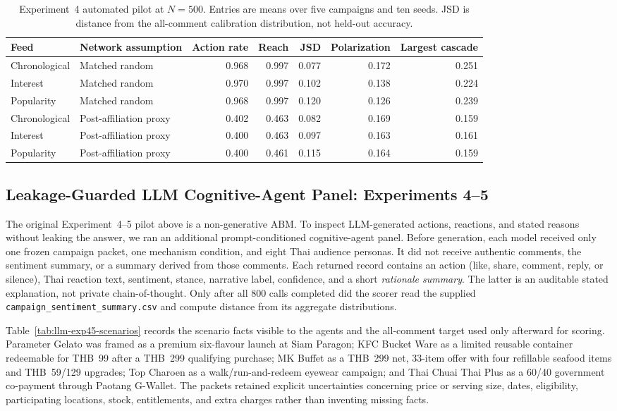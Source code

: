 \documentclass[conference]{IEEEtran}
\begin{document}
\begin{table}[t]
\caption{Experiment~4 automated pilot at $N=500$. Entries are means over five
campaigns and ten seeds. JSD is distance from the all-comment calibration
distribution, not held-out accuracy.}
\label{tab:pilot-exp4}
\centering
\footnotesize
\begin{tabular}{@{}llrrrrr@{}}
\toprule
Feed & Network assumption & Action rate & Reach & JSD & Polarization & Largest cascade \\
\midrule
Chronological & Matched random & 0.968 & 0.997 & 0.077 & 0.172 & 0.251 \\
Interest & Matched random & 0.970 & 0.997 & 0.102 & 0.138 & 0.224 \\
Popularity & Matched random & 0.968 & 0.997 & 0.120 & 0.126 & 0.239 \\
Chronological & Post-affiliation proxy & 0.402 & 0.463 & 0.082 & 0.169 & 0.159 \\
Interest & Post-affiliation proxy & 0.400 & 0.463 & 0.097 & 0.163 & 0.161 \\
Popularity & Post-affiliation proxy & 0.400 & 0.461 & 0.115 & 0.164 & 0.159 \\
\bottomrule
\end{tabular}
\end{table}

\subsection{Leakage-Guarded LLM Cognitive-Agent Panel: Experiments 4--5}

The original Experiment~4--5 pilot above is a non-generative ABM. To inspect
LLM-generated actions, reactions, and stated reasons without leaking the
answer, we ran an additional prompt-conditioned cognitive-agent panel. Before
generation, each model received only one frozen campaign packet, one mechanism
condition, and eight Thai audience personas. It did not receive authentic
comments, the sentiment summary, or a summary derived from those comments.
Each returned record contains an action (like, share, comment, reply, or
silence), Thai reaction text, sentiment, stance, narrative label, confidence,
and a short \emph{rationale summary}. The latter is an auditable stated
explanation, not private chain-of-thought. Only after all 800 calls completed
did the scorer read the supplied
\texttt{campaign\_sentiment\_summary.csv} and compute
distance from its aggregate distributions.

Table~\ref{tab:llm-exp45-scenarios} records the scenario facts visible to the
agents and the all-comment target used only afterward for scoring. Parameter
Gelato was framed as a premium six-flavour launch at Siam Paragon; KFC Bucket
Ware as a limited reusable container redeemable for THB~99 after a THB~299
qualifying purchase; MK Buffet as a THB~299 net, 33-item offer with four
refillable seafood items and THB~59/129 upgrades; Top Charoen as a
walk/run-and-redeem eyewear campaign; and Thai Chuai Thai Plus as a 60/40
government co-payment through Paotang G-Wallet. The packets retained explicit
uncertainties concerning price or serving size, dates, eligibility,
participating locations, stock, entitlements, and extra charges rather than
inventing missing facts.
\end{document}
